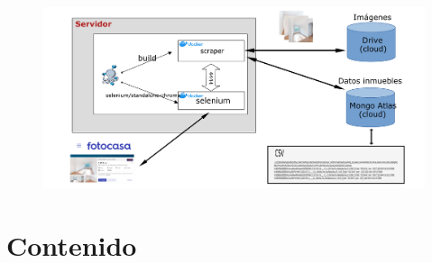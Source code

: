 \begin{figure}[H]
      \centering
      \includegraphics{images/project.png}
\end{figure}

\section{Contenido}

